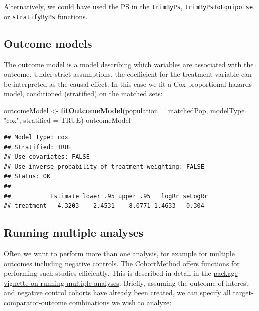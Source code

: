 \documentclass[11pt]{book}
\newenvironment{Shaded}{\begin{snugshade}}{\end{snugshade}}
\newcommand{\DataTypeTok}[1]{\textcolor[rgb]{0.13,0.29,0.53}{#1}}
\newcommand{\KeywordTok}[1]{\textcolor[rgb]{0.13,0.29,0.53}{\textbf{#1}}}
\newcommand{\NormalTok}[1]{#1}
\newcommand{\OtherTok}[1]{\textcolor[rgb]{0.56,0.35,0.01}{#1}}
\newcommand{\StringTok}[1]{\textcolor[rgb]{0.31,0.60,0.02}{#1}}
\theoremstyle{definition}
\theoremstyle{definition}
\theoremstyle{definition}
\theoremstyle{remark}
\begin{document}
Alternatively, we could have used the PS in the \texttt{trimByPs}, \texttt{trimByPsToEquipoise}, or \texttt{stratifyByPs} functions.

\hypertarget{outcome-models}{%
\subsection{Outcome models}\label{outcome-models}}

The outcome model is a model describing which variables are associated with the outcome. Under strict assumptions, the coefficient for the treatment variable can be interpreted as the causal effect. In this case we fit a Cox proportional hazards model, conditioned (stratified) on the matched sets:

\begin{Shaded}
\begin{Highlighting}[]
\NormalTok{outcomeModel <-}\StringTok{ }\KeywordTok{fitOutcomeModel}\NormalTok{(}\DataTypeTok{population =}\NormalTok{ matchedPop,}
                                \DataTypeTok{modelType =} \StringTok{"cox"}\NormalTok{,}
                                \DataTypeTok{stratified =} \OtherTok{TRUE}\NormalTok{)}
\NormalTok{outcomeModel}
\end{Highlighting}
\end{Shaded}

\begin{verbatim}
## Model type: cox
## Stratified: TRUE
## Use covariates: FALSE
## Use inverse probability of treatment weighting: FALSE
## Status: OK
## 
##           Estimate lower .95 upper .95   logRr seLogRr
## treatment   4.3203    2.4531    8.0771 1.4633   0.304
\end{verbatim}

\hypertarget{MultipleAnalyses}{%
\subsection{Running multiple analyses}\label{MultipleAnalyses}}

Often we want to perform more than one analysis, for example for multiple outcomes including negative controls. The \href{https://ohdsi.github.io/CohortMethod/}{CohortMethod} offers functions for performing such studies efficiently. This is described in detail in the \href{https://ohdsi.github.io/CohortMethod/articles/MultipleAnalyses.html}{package vignette on running multiple analyses}. Briefly, assuming the outcome of interest and negative control cohorts have already been created, we can specify all target-comparator-outcome combinations we wish to analyze:
\end{document}
